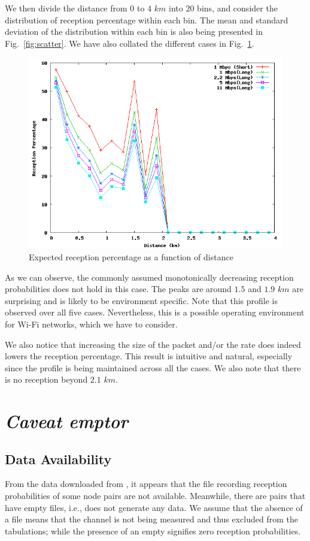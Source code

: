 \documentclass[11pt,twocolumn]{article}
\begin{document}
We then divide the distance from $0$ to $4$ $km$ into $20$ bins, and consider the distribution of reception percentage within each bin.  The mean and standard deviation of the distribution within each bin is also being presented in Fig.~\ref{fig:scatter}.  We have also collated the different cases in Fig.~\ref{fig:prob}.  

\begin{figure}[ht]
\centering
\includegraphics[width=0.8\linewidth]{Distro}
\caption{Expected reception percentage as a function of distance}
\label{fig:prob}
\end{figure}

As we can observe, the commonly assumed monotonically decreasing reception probabilities does not hold in this case.  The peaks are around $1.5$ and $1.9$ $km$ are surprising and is likely to be environment specific.  Note that this profile is observed over all five cases.  Nevertheless, this is a possible operating environment for Wi-Fi networks, which we have to consider.

We also notice that increasing the size of the packet and/or the rate does indeed lowers the reception percentage.  This result is intuitive and natural, especially since the profile is being maintained across all the cases.  We also note that there is no reception beyond $2.1$ $km$.

\section{\textit{Caveat emptor}}
\subsection{Data Availability}
From the data downloaded from \cite{roofnetdata}, it appears that the file recording reception probabilities of some node pairs are not available.  Meanwhile, there are pairs that have empty files, i.e., does not generate any data.  We assume that the absence of a file means that the channel is not being measured and thus excluded from the tabulations; while the presence of an empty signifies zero reception probabilities.
\end{document}
